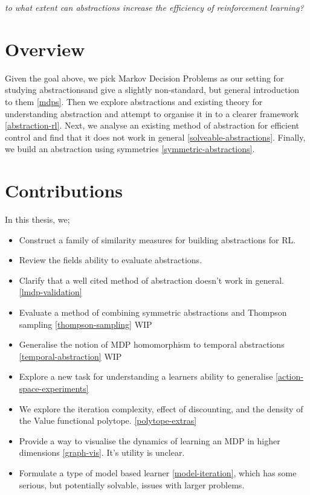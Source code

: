 \begin{displayquote}
\textit{to what extent can abstractions increase the efficiency of reinforcement learning?}
\end{displayquote}

\section{Overview}

Given the goal above, we pick Markov Decision Problems as our setting for studying abstractions\footnotemark[43] and give a slightly non-standard, but general introduction to them \ref{mdps}.
Then we explore abstractions and existing theory for understanding abstraction and attempt to organise it in to a clearer framework \ref{abstraction-rl}.
Next, we analyse an existing method of abstraction for efficient control and find that it does not work in general \ref{solveable-abstractions}.
Finally, we build an abstraction using symmetries \ref{symmetric-abstractions}.


\section{Contributions}

In this thesis, we;

\begin{itemize}
  \tightlist
  \item Construct a family of similarity measures for building abstractions for RL.
  \item Review the fields ability to evaluate abstractions.
  \item Clarify that a well cited method of abstraction doesn't work in general. \ref{lmdp-validation}
  \item Evaluate a method of combining symmetric abstractions and Thompson sampling \ref{thompson-sampling} {\color{red}WIP}
  \item Generalise the notion of MDP homomorphism to temporal abstractions \ref{temporal-abstraction} {\color{red}WIP}
  \item Explore a new task for understanding a learners ability to generalise \ref{action-space-experiments}
  \item We explore the iteration complexity, effect of discounting, and the density of the Value functional polytope. \ref{polytope-extras}
  \item Provide a way to visualise the dynamics of learning an MDP in higher dimensions \ref{graph-vis}. It's utility is unclear.
  \item Formulate a type of model based learner \ref{model-iteration}, which has some serious, but potentially solvable, issues with larger problems.
\end{itemize}
